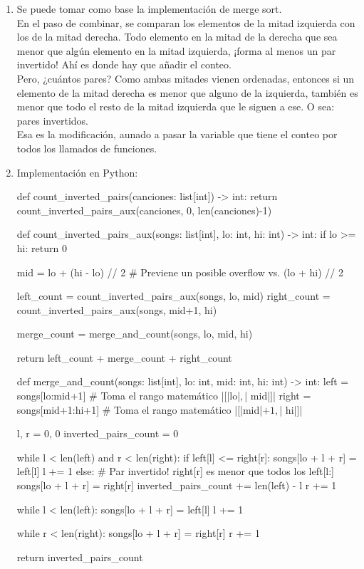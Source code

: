\begin{enumerate}
  \item Se puede tomar como base la implementación de merge sort. \\
  
  En el paso de combinar, se comparan los elementos de la mitad izquierda con los de la mitad derecha. Todo elemento en la mitad de la derecha que sea menor que algún elemento en la mitad izquierda, ¡forma al menos un par invertido! Ahí es donde hay que añadir el conteo. \\
  
  Pero, ¿cuántos pares? Como ambas mitades vienen ordenadas, entonces si un elemento de la mitad derecha es menor que alguno de la izquierda, también es menor que todo el resto de la mitad izquierda que le siguen a ese. O sea:  pares invertidos. \\

  Esa es la modificación, aunado a pasar la variable que tiene el conteo por todos los llamados de funciones.

  \pagebreak

  \item Implementación en Python:

\begin{pseudocode}
def count_inverted_pairs(canciones: list[int]) -> int:
    return count_inverted_pairs_aux(canciones, 0, len(canciones)-1)


def count_inverted_pairs_aux(songs: list[int], lo: int, hi: int) -> int:
    if lo >= hi: return 0

    mid = lo + (hi - lo) // 2  # Previene un posible overflow vs. (lo + hi) // 2

    left_count = count_inverted_pairs_aux(songs, lo, mid)
    right_count = count_inverted_pairs_aux(songs, mid+1, hi)

    merge_count = merge_and_count(songs, lo, mid, hi)

    return left_count + merge_count + right_count


def merge_and_count(songs: list[int], lo: int, mid: int, hi: int) -> int:
    left = songs[lo:mid+1]  # Toma el rango matemático |$[$|lo|$,$| mid|$]$|
    right = songs[mid+1:hi+1]  # Toma el rango matemático |$[$|mid|$+1,$| hi|$]$|

    l, r = 0, 0
    inverted_pairs_count = 0

    while l < len(left) and r < len(right):
        if left[l] <= right[r]:
            songs[lo + l + r] = left[l]
            l += 1
        else:  # Par invertido! right[r] es menor que todos los left[l:]
            songs[lo + l + r] = right[r]
            inverted_pairs_count += len(left) - l
            r += 1

    while l < len(left):
        songs[lo + l + r] = left[l]
        l += 1

    while r < len(right):
        songs[lo + l + r] = right[r]
        r += 1

    return inverted_pairs_count
\end{pseudocode}
\end{enumerate}
